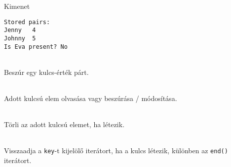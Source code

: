 \begin{frame}
    \begin{exampleblock}{}
        
    \end{exampleblock}
\end{frame}

\begin{frame}
    \begin{exampleblock}{}
        \footnotesize
        
    \end{exampleblock}
\end{frame}

\begin{frame}[fragile]
    \begin{block}{Kimenet}
        \small
        \vspace{-.4cm}
        \begin{verbatim}
Stored pairs:
Jenny	4
Johnny	5
Is Eva present? No
\end{verbatim}
        \vspace{-.3cm}
    \end{block}
    \vfill
    \begin{description}[m]
        \small
        \item[\hiv{\href{https://en.cppreference.com/w/cpp/container/map/insert}{\texttt{insert(value)}}}] \hfill \\ Beszúr egy kulcs-érték párt.
        \item[\hiv{\href{https://en.cppreference.com/w/cpp/container/map/operator_at}{\texttt{operator[](key)}}}] \hfill \\ Adott kulcsú elem olvasása vagy beszúrása / módosítása.
        \item[\hiv{\href{https://en.cppreference.com/w/cpp/container/map/erase}{\texttt{erase(key)}}}] \hfill \\ Törli az adott kulcsú elemet, ha létezik.
        \item[\hiv{\href{https://en.cppreference.com/w/cpp/container/map/find}{\texttt{find(key)}}}] \hfill \\ Visszaadja a \texttt{key}-t kijelölő iterátort, ha a kulcs létezik, különben az \texttt{end()} iterátort.
    \end{description}
\end{frame}